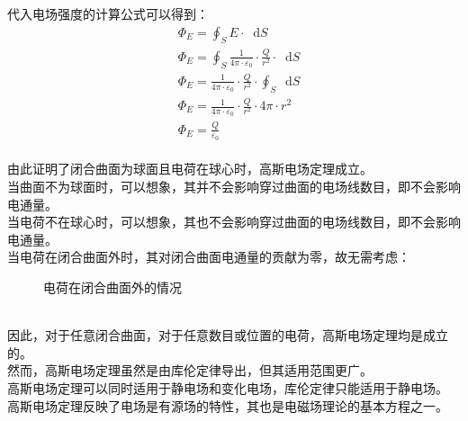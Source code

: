 \documentclass[UTF8]{ctexart}
\newcommand*{\dif}{\mathop{}\!\mathrm{d}}
\begin{document}
\newpage

    代入电场强度的计算公式可以得到：
    \begin{align}
        &\Phi_E=\oint_S E\cdot\dif S\\[5mm]
        &\Phi_E=\oint_S \frac{1}{4\pi\cdot\varepsilon_0}\cdot\frac{Q}{r^2}\cdot\dif S\\[5mm]
        &\Phi_E=\frac{1}{4\pi\cdot\varepsilon_0}\cdot\frac{Q}{r^2}\cdot\oint_S\dif S\\[5mm]
        &\Phi_E=\frac{1}{4\pi\cdot\varepsilon_0}\cdot\frac{Q}{r^2}\cdot 4\pi\cdot r^2\\[5mm]
        &\Phi_E=\frac{Q}{\varepsilon_0}
    \end{align}\\
    由此证明了闭合曲面为球面且电荷在球心时，高斯电场定理成立。\\[3mm]
    当曲面不为球面时，可以想象，其并不会影响穿过曲面的电场线数目，即不会影响电通量。\\[3mm]
    当电荷不在球心时，可以想象，其也不会影响穿过曲面的电场线数目，即不会影响电通量。\\[3mm]
    当电荷在闭合曲面外时，其对闭合曲面电通量的贡献为零，故无需考虑：\vspace{3pt}
    \begin{figure}[h]
        \begin{center}
            \caption{电荷在闭合曲面外的情况}
        \end{center}
    \end{figure}\\
    因此，对于任意闭合曲面，对于任意数目或位置的电荷，高斯电场定理均是成立的。\\[3mm]
    然而，高斯电场定理虽然是由库伦定律导出，但其适用范围更广。\\[3mm]
    高斯电场定理可以同时适用于静电场和变化电场，库伦定律只能适用于静电场。\\[3mm]
    高斯电场定理反映了电场是有源场的特性，其也是电磁场理论的基本方程之一。
\end{document}
